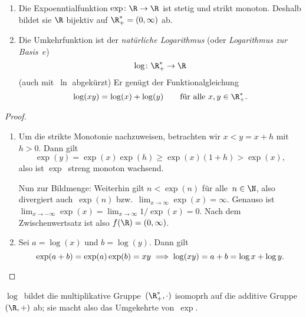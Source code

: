 \documentclass[a4paper]{article}
\begin{document}
\begin{proposition}\leavevmode
    \begin{enumerate}
        \item Die Expoenntialfunktion $\exp\colon \R \to \R$ ist stetig und strikt monoton. Deshalb bildet sie $\R$ bijektiv auf $\R_+^* = (0,\infty)$ ab.
        \item Die Umkehrfunktion ist der \emph{natürliche Logarithmus} (oder \emph{Logarithmus zur Basis~$e$})
              \begin{equation*}
                  \log\colon \R_+^* \to \R
              \end{equation*}
              (auch mit~$\ln$ abgekürzt) Er genügt der Funktionalgleichung
              \begin{equation*}
                  \log(xy) = \log(x) + \log(y) \qquad\text{für alle } x,y \in \R_+^*.
              \end{equation*}
    \end{enumerate}
\end{proposition}

\begin{proof}\leavevmode
    \begin{enumerate}
        \item Um die strikte Monotonie nachzuweisen, betrachten wir $x < y = x+h$ mit~$h > 0$. Dann gilt
              \begin{equation*}
                  \exp(y) = \exp(x) \exp(h) \geq \exp(x) (1+h) > \exp(x),
              \end{equation*}
              also ist $\exp$~streng monoton wachsend.

              Nun zur Bildmenge: Weiterhin gilt $n < \exp(n)$ für alle~$n \in \N$, also divergiert auch~$\exp(n)$ bzw.\ $\lim_{x\to\infty} \exp(x) = \infty$. Genauso ist $\lim_{x\to-\infty} \exp(x) = \lim_{x\to\infty} 1/\exp(x) = 0$. Nach dem Zwischenwertsatz ist also $f(\R) = (0,\infty)$.
        \item Sei $a = \log(x)$ und $b = \log(y)$. Dann gilt
              \begin{equation*}
                  \exp(a+b) = \exp(a)\exp(b) = xy \implies \log(xy) = a+b = \log x + \log y. \qedhere
              \end{equation*}
    \end{enumerate}
\end{proof}

\begin{remark}
    $\log$~bildet die multiplikative Gruppe~$(\R_+^*,\cdot)$ isomoprh auf die additive Gruppe~$(\R,+)$ ab; sie macht also das Umgekehrte von~$\exp$.
\end{remark}
\end{document}
